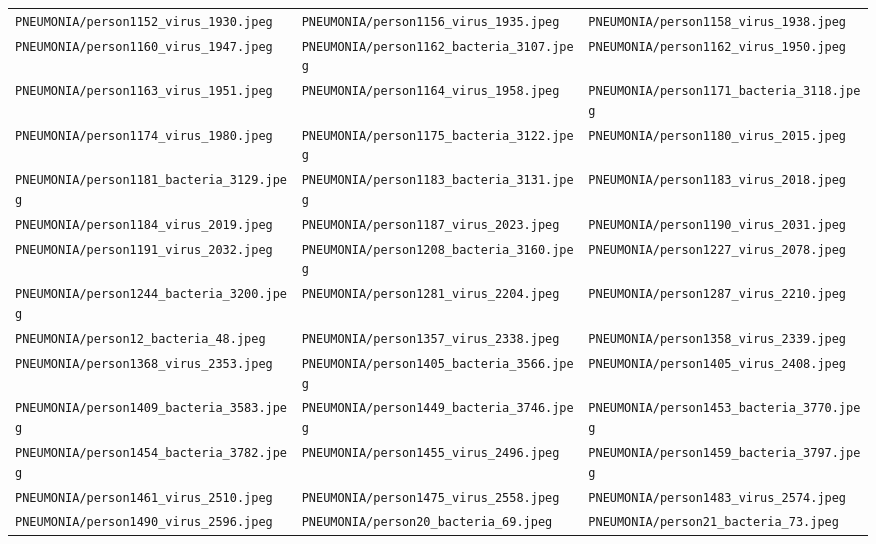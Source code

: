 \begin{center}
\begin{longtable}{lll}
\texttt{PNEUMONIA/person1152\_virus\_1930.jpeg} & \texttt{PNEUMONIA/person1156\_virus\_1935.jpeg} & \texttt{PNEUMONIA/person1158\_virus\_1938.jpeg} \\
\texttt{PNEUMONIA/person1160\_virus\_1947.jpeg} & \texttt{PNEUMONIA/person1162\_bacteria\_3107.jpeg} & \texttt{PNEUMONIA/person1162\_virus\_1950.jpeg} \\
\texttt{PNEUMONIA/person1163\_virus\_1951.jpeg} & \texttt{PNEUMONIA/person1164\_virus\_1958.jpeg} & \texttt{PNEUMONIA/person1171\_bacteria\_3118.jpeg} \\
\texttt{PNEUMONIA/person1174\_virus\_1980.jpeg} & \texttt{PNEUMONIA/person1175\_bacteria\_3122.jpeg} & \texttt{PNEUMONIA/person1180\_virus\_2015.jpeg} \\
\texttt{PNEUMONIA/person1181\_bacteria\_3129.jpeg} & \texttt{PNEUMONIA/person1183\_bacteria\_3131.jpeg} & \texttt{PNEUMONIA/person1183\_virus\_2018.jpeg} \\
\texttt{PNEUMONIA/person1184\_virus\_2019.jpeg} & \texttt{PNEUMONIA/person1187\_virus\_2023.jpeg} & \texttt{PNEUMONIA/person1190\_virus\_2031.jpeg} \\
\texttt{PNEUMONIA/person1191\_virus\_2032.jpeg} & \texttt{PNEUMONIA/person1208\_bacteria\_3160.jpeg} & \texttt{PNEUMONIA/person1227\_virus\_2078.jpeg} \\
\texttt{PNEUMONIA/person1244\_bacteria\_3200.jpeg} & \texttt{PNEUMONIA/person1281\_virus\_2204.jpeg} & \texttt{PNEUMONIA/person1287\_virus\_2210.jpeg} \\
\texttt{PNEUMONIA/person12\_bacteria\_48.jpeg} & \texttt{PNEUMONIA/person1357\_virus\_2338.jpeg} & \texttt{PNEUMONIA/person1358\_virus\_2339.jpeg} \\
\texttt{PNEUMONIA/person1368\_virus\_2353.jpeg} & \texttt{PNEUMONIA/person1405\_bacteria\_3566.jpeg} & \texttt{PNEUMONIA/person1405\_virus\_2408.jpeg} \\
\texttt{PNEUMONIA/person1409\_bacteria\_3583.jpeg} & \texttt{PNEUMONIA/person1449\_bacteria\_3746.jpeg} & \texttt{PNEUMONIA/person1453\_bacteria\_3770.jpeg} \\
\texttt{PNEUMONIA/person1454\_bacteria\_3782.jpeg} & \texttt{PNEUMONIA/person1455\_virus\_2496.jpeg} & \texttt{PNEUMONIA/person1459\_bacteria\_3797.jpeg} \\
\texttt{PNEUMONIA/person1461\_virus\_2510.jpeg} & \texttt{PNEUMONIA/person1475\_virus\_2558.jpeg} & \texttt{PNEUMONIA/person1483\_virus\_2574.jpeg} \\
\texttt{PNEUMONIA/person1490\_virus\_2596.jpeg} & \texttt{PNEUMONIA/person20\_bacteria\_69.jpeg} & \texttt{PNEUMONIA/person21\_bacteria\_73.jpeg} \\

\end{longtable}
\end{center}
